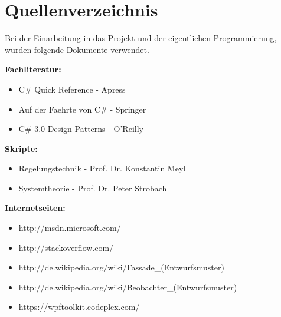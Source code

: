 \chapter{Quellenverzeichnis}

Bei der Einarbeitung in das Projekt und der eigentlichen Programmierung, wurden folgende Dokumente verwendet.

\begin{description}
	 
\item \textbf{Fachliteratur:}
				
\begin{itemize}
	\item C\# Quick Reference    -    Apress
	\item Auf der Faehrte von C\#    -    Springer
	\item C\# 3.0 Design Patterns    -    O'Reilly 
\end{itemize}

\item \textbf{Skripte:}
				
\begin{itemize}
	\item Regelungstechnik    -    Prof. Dr. Konstantin Meyl
	\item Systemtheorie    -    Prof. Dr. Peter Strobach
\end{itemize}

\item \textbf{Internetseiten:}
				
\begin{itemize}
	\item http://msdn.microsoft.com/
	\item http://stackoverflow.com/
	\item http://de.wikipedia.org/wiki/Fassade\_(Entwurfsmuster)
	\item http://de.wikipedia.org/wiki/Beobachter\_(Entwurfsmuster)
	\item https://wpftoolkit.codeplex.com/
\end{itemize}

\end{description}